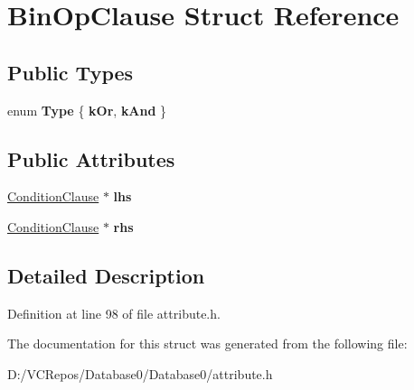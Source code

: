 \hypertarget{struct_bin_op_clause}{}\section{Bin\+Op\+Clause Struct Reference}
\label{struct_bin_op_clause}
\subsection*{Public Types}
\begin{DoxyCompactItemize}
\item 
\mbox{\label{struct_bin_op_clause_a4221e9710af952343f2abb774b74afc1}} 
enum {\bfseries Type} \{ {\bfseries k\+Or}, 
{\bfseries k\+And}
 \}
\end{DoxyCompactItemize}
\subsection*{Public Attributes}
\begin{DoxyCompactItemize}
\item 
\mbox{\label{struct_bin_op_clause_ac563464b1d96821013903ea9fb97de57}} 
\mbox{\hyperlink{class_condition_clause}{Condition\+Clause}} $\ast$ {\bfseries lhs}
\item 
\mbox{\label{struct_bin_op_clause_ac39b8ff123b210875516e1a972aafbce}} 
\mbox{\hyperlink{class_condition_clause}{Condition\+Clause}} $\ast$ {\bfseries rhs}
\end{DoxyCompactItemize}


\subsection{Detailed Description}


Definition at line 98 of file attribute.\+h.



The documentation for this struct was generated from the following file\+:\begin{DoxyCompactItemize}
\item 
D\+:/\+V\+C\+Repos/\+Database0/\+Database0/attribute.\+h\end{DoxyCompactItemize}
